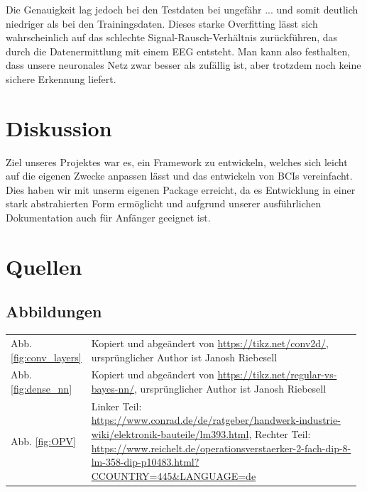 \documentclass[10pt]{article}
\begin{document}
Die Genauigkeit lag jedoch bei den Testdaten bei ungefähr ... %
und somit deutlich niedriger als bei den Trainingsdaten. 
Dieses starke Overfitting lässt sich wahrscheinlich auf das schlechte Signal-Rausch-Verhältnis zurückführen, das durch die Datenermittlung mit einem EEG entsteht. Man kann also festhalten, dass unsere neuronales Netz zwar besser als zufällig ist, aber trotzdem noch keine sichere Erkennung liefert.

\section{Diskussion}

Ziel unseres Projektes war es, ein Framework zu entwickeln, welches sich leicht auf die eigenen Zwecke anpassen lässt und das entwickeln von BCIs vereinfacht. Dies haben wir mit unserm eigenen Package erreicht, da es Entwicklung in einer stark abstrahierten Form ermöglicht und aufgrund unserer ausführlichen Dokumentation auch für Anfänger geeignet ist.

\section{Quellen}
\subsection{Abbildungen}
\begin{table}[h!]
    \centering
    {
    \setlength{\tabcolsep}{0pt}
    \begin{tabular}{p{0.08\linewidth}p{0.9\linewidth}}
        Abb. \ref{fig:conv_layers} %
        & Kopiert und abgeändert von \href{https://tikz.net/conv2d/}{https://tikz.net/conv2d/}, ursprünglicher Author ist Janosh Riebesell  \\
        Abb. \ref{fig:dense_nn} %
        & Kopiert und abgeändert von \href{https://tikz.net/regular-vs-bayes-nn/}{https://tikz.net/regular-vs-bayes-nn/}, ursprünglicher Author ist Janosh Riebesell \\
        Abb. \ref{fig:OPV} %
        & Linker Teil: \href{https://www.conrad.de/de/ratgeber/handwerk-industrie-wiki/elektronik-bauteile/lm393.html}{https://www.conrad.de/de/ratgeber/handwerk-industrie-wiki/elektronik-bauteile/lm393.html}, Rechter Teil: \href{https://www.reichelt.de/operationsverstaerker-2-fach-dip-8-lm-358-dip-p10483.html?CCOUNTRY=445\&LANGUAGE=de}{https://www.reichelt.de/operationsverstaerker-2-fach-dip-8-lm-358-dip-p10483.html?CCOUNTRY=445\&LANGUAGE=de}\\
    \end{tabular}
    }
    \label{tab:my_label}
\end{table}
\printbibliography[title={Literatur}, keyword={Literatur}]
\printbibliography[title={Anderes}, notkeyword={Literatur}]
\end{document}
